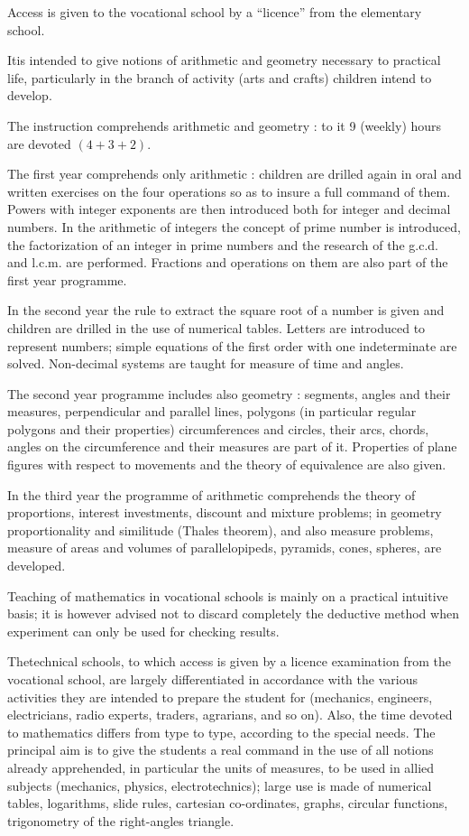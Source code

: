 Access is given to the vocational school by a ``licence'' from the elementary school.

It\pageoriginale is intended to give notions of arithmetic and geometry necessary to practical life, particularly in the branch of activity (arts and crafts) children intend to develop.

The instruction comprehends arithmetic and geometry : to it 9 (weekly) hours are devoted $(4+3+2)$.

The first year comprehends only arithmetic : children are drilled again in oral and written exercises on the four operations so as to insure a full command of them. Powers with integer exponents are then introduced both for integer and decimal numbers. In the arithmetic of integers the concept of prime number is introduced, the factorization of an integer in prime numbers and the research of the g.c.d. and l.c.m. are performed. Fractions and operations on them are also part of the first year programme.

In the second year the rule to extract the square root of a number is given and children are drilled in the use of numerical tables. Letters are introduced to represent numbers; simple equations of the first order with one indeterminate are solved. Non-decimal systems are taught for measure of time and angles.

The second year programme includes also geometry : segments, angles and their measures, perpendicular and parallel lines, polygons (in particular regular polygons and their properties) circumferences and circles, their arcs, chords, angles on the circumference and their measures are part of it. Properties of plane figures with respect to movements and the theory of equivalence are also given.

In the third year the programme of arithmetic comprehends the theory of proportions, interest investments, discount and mixture problems; in geometry proportionality and similitude (Thales theorem), and also measure problems, measure of areas and volumes of parallelopipeds, pyramids, cones, spheres, are developed.

Teaching of mathematics in vocational schools is mainly on a practical intuitive basis; it is however advised not to discard completely the deductive method when experiment can only be used for checking results.

The\pageoriginale technical schools, to which access is given by a licence examination from the vocational school, are largely differentiated in accordance with the various activities they are intended to prepare the student for (mechanics, engineers, electricians, radio experts, traders, agrarians, and so on). Also, the time devoted to mathematics differs from type to type, according to the special needs. The principal aim is to give the students a real command in the use of all notions already apprehended, in particular the units of measures, to be used in allied subjects (mechanics, physics, electrotechnics); large use is made of numerical tables, logarithms, slide rules, cartesian co-ordinates, graphs, circular functions, trigonometry of the right-angles triangle.

